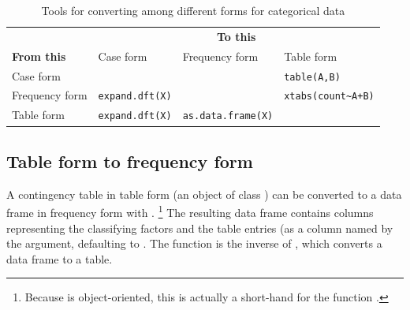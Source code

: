 \documentclass[11pt]{book}
\begin{document}
\begin{table}[htb]
 \caption{Tools for converting among different forms for categorical data}\label{tab:convert}
 \newsavebox{\adfxtabs}
 \begin{center}
   \begin{tabular}{l|lll}
  \hline
                 & \multicolumn{3}{c}{\textbf{To this}} \\
	\textbf{From this}      &     Case form         & Frequency form             &  Table form \\
	\hline
  Case form      &                        & \usebox{\adfxtabs}        &  \verb|table(A,B)|  \\ 
	Frequency form &  \verb|expand.dft(X)|  &                           & \verb|xtabs(count~A+B)|\\
	Table form     &  \verb|expand.dft(X)|  & \verb|as.data.frame(X)|   &       \\
	\hline
   \end{tabular}
 \end{center}
\end{table}

\subsection{Table form to frequency form}
A contingency table in table form (an object of class ) can be converted
to a data frame in frequency form with .%
\footnote{
Because \R is object-oriented, this is actually a short-hand for
the function .
}  
The resulting
data frame contains columns
representing the classifying factors and the table entries (as a column named by
the  argument, defaulting to .  The function
 is the inverse of , which converts a data frame to a table.
\end{document}
